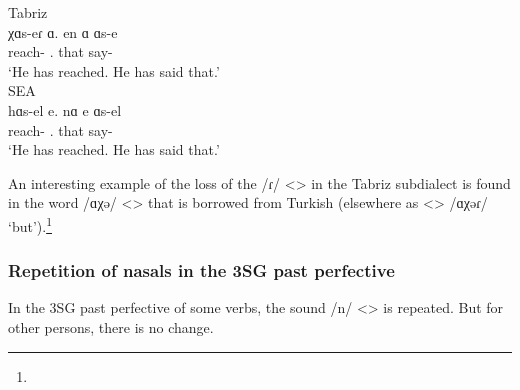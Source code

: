\begin{exe}
	\ex \begin{xlist}
		\ex Tabriz\\\gll 
		χɑs-eɾ ɑ. en ɑ ɑs-e \\
		reach-{\perfcvb} {\aux}. that {\aux} say-{\perfcvb} \\
		\trans `He has reached. He has said that.' \\
		
		\ex SEA \\\gll 
		hɑs-el e. nɑ e ɑs-el \\
		reach-{\perfcvb} {\aux}. that {\aux} say-{\perfcvb} \\
		\trans `He has reached. He has said that.' \\
	\end{xlist}
\end{exe}

An interesting example of the loss of the /ɾ/ <> in the Tabriz subdialect is found in the word /ɑχə/ <> that is borrowed from Turkish (elsewhere as <> /ɑχəɾ/ `but').\footnote{} 
\subsubsection{Repetition of nasals in the 3SG past perfective} 




In the 3SG past perfective of some verbs, the sound /n/ <> is repeated. But for other persons, there is no change. 


\begin{table}[H]
	\centering
	\caption{Repetition or gemination of a nasal in the 3{\sg} past perfective 1{\sg} of some verbs in the Astabad subdialect of the Yerevan dialect}
	\label{tab:Yerevan:subdialect:tabriz:gemNasal}
\end{table}

